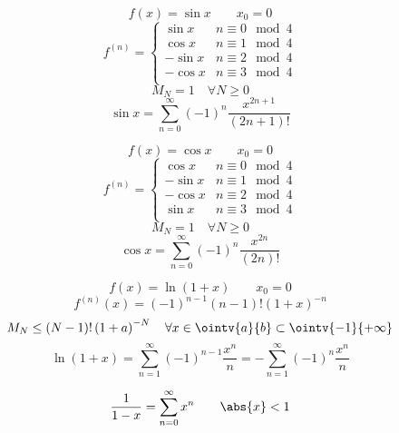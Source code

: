 \begin{example}
  $$f\left( x \right)=\sin x\qquad x_0=0$$
  $$
    f^{\left( n \right)}=
    \begin{cases}
      \sin x  & n\equiv 0\mod{4} \\
      \cos x  & n\equiv 1\mod{4} \\
      -\sin x & n\equiv 2\mod{4} \\
      -\cos x & n\equiv 3\mod{4} \\
    \end{cases}
  $$
  $$M_N=1\quad \forall N\ge0$$
  $$\sin x=\sum_{n=0}^\infty\left( -1 \right)^n\frac{x^{2n+1}}{\left( 2n+1 \right)!}$$
\end{example}

\begin{example}
  $$f\left( x \right)=\cos x\qquad x_0=0$$
  $$
    f^{\left( n \right)}=
    \begin{cases}
      \cos x  & n\equiv 0\mod{4} \\
      -\sin x & n\equiv 1\mod{4} \\
      -\cos x & n\equiv 2\mod{4} \\
      \sin x  & n\equiv 3\mod{4} \\
    \end{cases}
  $$
  $$M_N=1\quad \forall N\ge0$$
  $$\cos x=\sum_{n=0}^\infty\left( -1 \right)^n\frac{x^{2n}}{\left( 2n \right)!}$$
\end{example}

\begin{example}
  $$f\left( x \right)=\ln\left( 1+x \right)\qquad x_0=0$$
  $$f^{\left( n \right)}\left( x \right)=\left( -1 \right)^{n-1}\left( n-1 \right)!\left( 1+x \right)^{-n}$$
  $$M_N\le \left( N-1 \right)!\left( 1+a \right)^{-N}\quad \forall x\in\ointv{a}{b}\subset\ointv{-1}{+\infty}$$
  $$\ln\left( 1+x \right)=\sum_{n=1}^\infty\left( -1 \right)^{n-1}\frac{x^n}{n}=-\sum_{n=1}^\infty\left( -1 \right)^n\frac{x^n}{n}$$
\end{example}

\begin{example}
  $$\frac{1}{1-x}=\sum_{n=0}^\infty x^n\qquad\abs{x}<1$$
\end{example}

